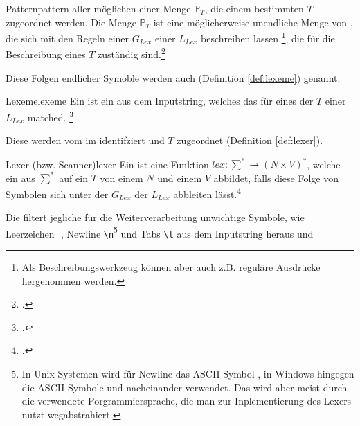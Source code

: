 \begin{Definition}{Pattern}{pattern}
   aller möglichen  einer Menge $\mathbb{P}_{T}$, die einem bestimmten  $T$ zugeordnet werden.
  Die Menge $\mathbb{P}_{T}$ ist eine möglicherweise unendliche Menge von , die sich mit den Regeln einer  ${G}_{Lex}$ einer  ${L}_{Lex}$ beschreiben lassen \footnote{Als Beschreibungswerkzeug können aber auch z.B. reguläre Ausdrücke hergenommen werden.}, die für die Beschreibung eines  $T$ zuständig sind.\footcite{noauthor_what_nodate}
\end{Definition}

Diese Folgen endlicher Symoble werden auch  (Definition \ref{def:lexeme}) genannt.

\begin{Definition}{Lexeme}{lexeme}
  Ein  ist ein  aus dem Inputstring, welches das  für eines der  $T$ einer  ${L}_{Lex}$ matched.
\footcite{noauthor_what_nodate}
\end{Definition}

Diese  werden vom  im  identifziert und  $T$ zugeordnet (Definition \ref{def:lexer}).

\begin{Definition}{Lexer (bzw. Scanner)}{lexer}
  Ein  ist eine  Funktion \hspace{0.2cm}$lex: \sum^{*} \rightharpoonup (N \times V)^{*}$, welche ein  aus $\sum^{*}$ auf ein  $T$ von einem  $N$ und einem   $V$ abbildet, falls diese Folge von Symbolen sich unter der  ${G}_{Lex}$ der  ${L_{Lex}}$ abbleiten lässt.\footcite{noauthor_lecture-notes-2021_2022}
\end{Definition}

Die  filtert jegliche für die Weiterverarbeitung unwichtige Symbole, wie Leerzeichen \,\textvisiblespace\,, Newline \verb|\n|\footnote{In Unix Systemen wird für Newline das ASCII Symbol , in Windows hingegen die ASCII Symbole  und  nacheinander verwendet. Das wird aber meist durch die verwendete Porgrammiersprache, die man zur Inplementierung des Lexers nutzt wegabstrahiert.} und Tabs \verb|\t| aus dem Inputstring heraus und

